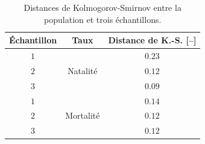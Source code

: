 \documentclass[a4paper, 12pt]{article}
\begin{document}
	\begin{table}[h!]
		\centering
		\begin{tabular}{|c|c|c|}
			\hline
			Échantillon &            Taux            &   Distance de K.-S. [--]   \\ \hline\hline
			    $1$     & \multirow{3}{*}{Natalité}  & $\num{0.23}$ \\ \cline{1-1}\cline{3-3}
			    $2$     &                            & $\num{0.12}$ \\ \cline{1-1}\cline{3-3}
			    $3$     &                            & $\num{0.09}$ \\ \hline\hline
			    $1$     & \multirow{3}{*}{Mortalité} & $\num{0.14}$ \\ \cline{1-1}\cline{3-3}
			    $2$     &                            & $\num{0.12}$ \\ \cline{1-1}\cline{3-3}
			    $3$     &                            & $\num{0.12}$ \\ \hline
		\end{tabular}
		\caption{Distances de Kolmogorov-Smirnov entre la population et trois échantillons.}
		\label{table:Q2aiii}
	\end{table}
\end{document}

